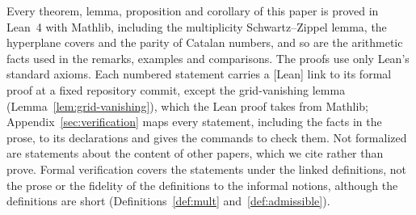 Every theorem, lemma, proposition and corollary of this paper is proved in
Lean~4 with Mathlib, including the multiplicity Schwartz--Zippel lemma, the
hyperplane covers and the parity of Catalan numbers, and so are the arithmetic
facts used in the remarks, examples and comparisons. The proofs use only Lean's
standard axioms. Each numbered statement carries a [Lean] link to its formal
proof at a fixed repository commit, except the grid-vanishing lemma
(Lemma~\ref{lem:grid-vanishing}), which the Lean proof takes from Mathlib;
Appendix~\ref{sec:verification} maps every statement, including the facts in the
prose, to its declarations and gives the commands to check them. Not formalized
are statements about the content of other papers, which we cite rather than
prove. Formal verification covers the statements under the linked definitions,
not the prose or the fidelity of the definitions to the informal notions,
although the definitions are short (Definitions~\ref{def:mult}
and~\ref{def:admissible}).
